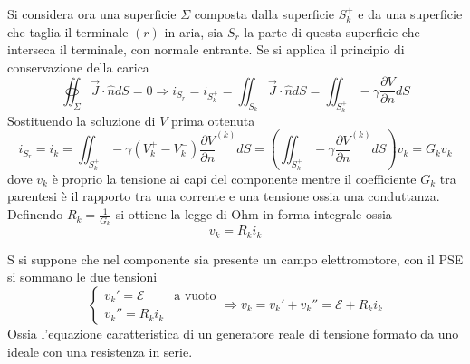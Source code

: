 Si considera ora una superficie $\Sigma$ composta dalla superficie $S_k^+$ e da una
superficie che taglia il terminale $(r)$ in aria, sia $S_r$ la parte di questa 
superficie che interseca il terminale, con normale entrante.
Se si applica il principio di conservazione della carica
$$
\oiint_\Sigma \vec{J}\cdot\hat{n} dS = 0 \Rightarrow i_{S_r} = i_{S_k^+} = \iint_{S_k} \vec{J}\cdot\hat{n}dS = \iint_{S_k^+}-\gamma\frac{\partial V}{\partial n} dS
$$
Sostituendo la soluzione di $V$ prima ottenuta
$$
i_{S_r} = i_k = \iint_{S_k^+} -\gamma\left(V_k^+ - V_k^-\right)\frac{\partial V}{\partial n}^{(k)} dS = \left( \iint_{S_k^+} -\gamma\frac{\partial V}{\partial n}^{(k)} dS \right)
v_k = G_k v_k
$$
dove $v_k$ è proprio la tensione ai capi del componente mentre il coefficiente $G_k$
tra parentesi è il rapporto tra una corrente e una tensione ossia una conduttanza.
Definendo $R_k = \frac{1}{G_k}$ si ottiene la legge di Ohm in forma integrale
ossia
$$
v_k = R_ki_k
$$

S si suppone che nel componente sia presente un campo elettromotore, con il PSE
si sommano le due tensioni
$$
\begin{cases}
v_k' = \mathcal{E} & \text{a vuoto}\\
v_k'' = R_ki_k 
\end{cases}\Rightarrow
v_k = v_k' + v_k'' = \mathcal{E} + R_ki_k
$$
Ossia l'equazione caratteristica di un generatore reale di tensione formato da uno ideale
con una resistenza in serie.
